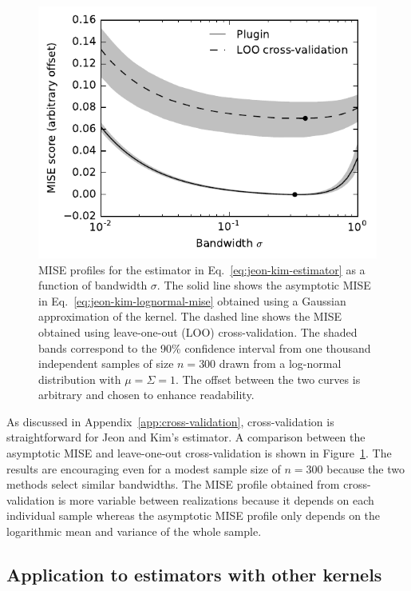 \begin{figure}
\begin{centering}
\includegraphics{bandwidth-comparison}
\par\end{centering}

\caption{\label{fig:bandwidth-comparison}MISE profiles for the estimator in Eq.~\eqref{eq:jeon-kim-estimator} as a function of bandwidth $\sigma$. The solid line shows the asymptotic MISE in Eq.~\eqref{eq:jeon-kim-lognormal-mise} obtained using a Gaussian approximation of the kernel. The dashed line shows the MISE obtained using leave-one-out (LOO) cross-validation. The shaded bands correspond to the 90\% confidence interval from one thousand independent samples of size $n=300$ drawn from a log-normal distribution with $\mu=\Sigma=1$. The offset between the two curves is arbitrary and chosen to enhance readability.}
\end{figure}
As discussed in Appendix~\ref{app:cross-validation}, cross-validation is straightforward for Jeon and Kim's estimator. A comparison between the asymptotic MISE and leave-one-out cross-validation is shown in Figure~\ref{fig:bandwidth-comparison}. The results are encouraging even for a modest sample size of $n=300$ because the two methods select similar bandwidths. The MISE profile obtained from cross-validation is more variable between realizations because it depends on each individual sample whereas the asymptotic MISE profile only depends on the logarithmic mean and variance of the whole sample.


\subsection{Application to estimators with other kernels\label{subsec:other-kernels}}

